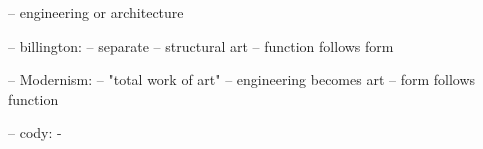-- engineering or architecture

-- billington:
  -- separate
  -- structural art
  -- function follows form

-- Modernism:
  -- "total work of art"
  -- engineering becomes art
  -- form follows function

-- cody:
  -
